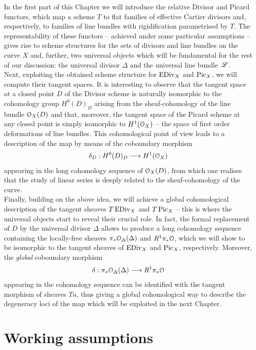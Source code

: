 In the first part of this Chapter we will introduce the relative Divisor and Picard functors, which map a scheme $T$ to flat families of effective Cartier divisors and, respectively, to families of line bundles with rigidification parametrised by $T$. 
The representability of these functors -- achieved under some particular assumptions -- gives rise to scheme structures for the sets of divisors and line bundles on the curve $X$ and, further, two universal objects which will be fundamental for the rest of our discussion: the universal divisor $\Delta$ and the universal line bundle $\mathscr{L}$.\\
Next, exploiting the obtained scheme structure for $\operatorname{EDiv}_X$ and $\operatorname{Pic}_X$, we will compute their tangent spaces. 
It is interesting to observe that the tangent space at a closed point $D$ of the Divisor scheme is naturally isomorphic to the cohomology group $H^0(D)_D$ arising from the sheaf-cohomology of the line bundle $\mathcal{O}_X(D)$ and that, moreover, the tangent space of the Picard scheme at any closed point is simply isomorphic to $H^1(\mathcal{O}_X)$ -- the space of first order deformations of line bundles.
This cohomological point of view leads to a description of the \AJJ map by means of the coboundary morphism 
$$ \delta_D : H^0(D)_D \longrightarrow H^1(\mathcal{O}_X) $$
appearing in the long cohomology sequence of $\mathcal{O}_X(D)$, from which one realises that the study of linear series is deeply related to the sheaf-cohomology of the curve.\\
Finally, building on the above idea, we will achieve a global cohomological description of the tangent sheaves $T\operatorname{EDiv}_X$ and $T\operatorname{Pic}_X$ --
this is where the universal objects start to reveal their crucial role. In fact, the formal replacement of $D$ by the universal divisor $\Delta$ allows to produce a long cohomology sequence containing the locally-free sheaves $\pi_* \mathcal{O}_{\Delta}(\Delta)$ and $R^1 \pi_* \mathcal{O}$, which we will show to be isomorphic to the tangent sheaves of $\operatorname{EDiv}_X$ and $\operatorname{Pic}_X$, respectively. 
Moreover, the \emph{global} coboundary morphism 
$$ \delta: \pi_* \mathcal{O}_{\Delta}(\Delta) \longrightarrow R^1 \pi_* \mathcal{O} $$
appearing in the cohomology sequence can be identified with the tangent morphism of sheaves $Tu$, thus giving a global cohomological way to describe the degeneracy loci of the \AJJ map which will be exploited in the next Chapter. 

\section{Working assumptions}\label{sec:assumptions}
	
